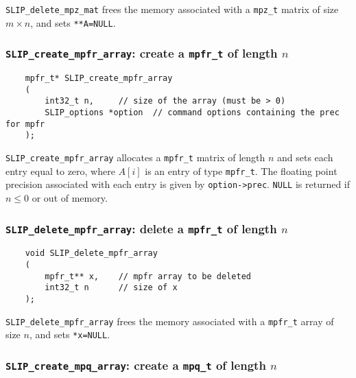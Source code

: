 \documentclass[12pt]{article}
\theoremstyle{definition}
\begin{document}
\verb|SLIP_delete_mpz_mat| frees the memory associated with a \verb|mpz_t|
matrix of size $m \times n$, and sets \verb|**A=NULL|.

\cprotect\subsubsection{\verb|SLIP_create_mpfr_array|: create a \verb|mpfr_t| of length $n$}

\begin{mdframed}[userdefinedwidth=6in]
{\footnotesize
\begin{verbatim}
    mpfr_t* SLIP_create_mpfr_array
    (
        int32_t n,     // size of the array (must be > 0)
        SLIP_options *option  // command options containing the prec for mpfr
    );
\end{verbatim}
} \end{mdframed}

\verb|SLIP_create_mpfr_array| allocates a \verb|mpfr_t| matrix of length $n$
and sets each entry equal to zero, where  $A[i]$ is an entry of type
\verb|mpfr_t|. The floating point precision associated with each entry is given
by \verb|option->prec|. \verb|NULL| is returned if
$n\le 0$ or out of memory.


\cprotect\subsubsection{\verb|SLIP_delete_mpfr_array|: delete a \verb|mpfr_t| of length $n$}

\begin{mdframed}[userdefinedwidth=6in]
{\footnotesize
\begin{verbatim}
    void SLIP_delete_mpfr_array
    (
        mpfr_t** x,    // mpfr array to be deleted
        int32_t n      // size of x
    );
\end{verbatim}
} \end{mdframed}

\verb|SLIP_delete_mpfr_array| frees the memory associated with a \verb|mpfr_t|
array of size $n$, and sets \verb|*x=NULL|.

\cprotect\subsubsection{\verb|SLIP_create_mpq_array|: create a \verb|mpq_t| of length $n$}
\end{document}
